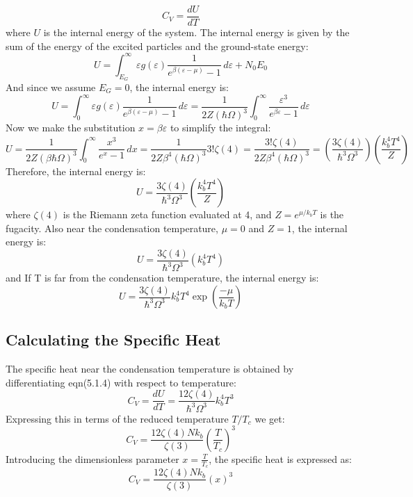 \documentclass{article}
\numberwithin{equation}{section}
\numberwithin{equation}{subsection}
\begin{document}
$$C_V = \frac{dU}{dT}$$
where \( U \) is the internal energy of the system. The internal energy is given by the sum of the energy of the excited particles and the ground-state energy:
\begin{equation}
    U = \int_{E_G}^{\infty} \varepsilon g(\varepsilon) \frac{1}{e^{\beta(\varepsilon - \mu)} - 1} \,d\varepsilon + N_0 E_0
\end{equation}
And since we assume $E_G = 0$, the internal energy is:
\begin{equation}
    U = \int_{0}^{\infty} \varepsilon g(\varepsilon) \frac{1}{e^{\beta(\varepsilon - \mu)} - 1} \,d\varepsilon = \frac{1}{2Z(\hbar\Omega)^3} \int_{0}^{\infty} \frac{\varepsilon^3}{e^{\beta\varepsilon} - 1} \,d\varepsilon
\end{equation}
Now we make the substitution \( x = \beta\varepsilon\) to simplify the integral:
$$U = \frac{1}{2Z(\beta\hbar\Omega)^3} \int_{0}^{\infty} \frac{x^3}{e^x - 1} \,dx = \frac{1}{2Z\beta^4(\hbar\Omega)^3} 3!\zeta(4) = \frac{3!\zeta(4)}{2Z\beta^4(\hbar\Omega)^3} =   \left(\frac{3\zeta(4)}{\hbar^3\Omega^3}\right) \left(\frac{k_b^4T^4}{Z}\right) 
$$
Therefore, the internal energy is:
\begin{equation}
    U = \frac{3\zeta(4)}{\hbar^3\Omega^3} \left(\frac{k_b^4T^4}{Z}\right)
\end{equation}
where \( \zeta(4) \) is the Riemann zeta function evaluated at 4, and $Z = e^{\mu/k_bT}$ is the fugacity. Also near the condensation temperature, $\mu = 0$ and $Z = 1$, the internal energy is:   
\begin{equation}
    U = \frac{3\zeta(4)}{\hbar^3\Omega^3} \left(k_b^4T^4\right) 
\end{equation}
and If T is far from the condensation temperature, the internal energy is:
\begin{equation}
    U = \frac{3\zeta(4)}{\hbar^3\Omega^3} k_b^4T^4\exp\left(\frac{-\mu}{k_bT}\right)
\end{equation}


\subsection{Calculating the Specific Heat}
The specific heat near the condensation temperature is obtained by differentiating eqn(5.1.4) with respect to temperature:
\begin{equation}
    C_V = \frac{dU}{dT} = \frac{12\zeta(4)}{\hbar^3\Omega^3}k_b^4T^3
\end{equation}
Expressing this in terms of the reduced temperature \( T/T_c \) we get:
\begin{equation}
    C_V = \frac{12\zeta(4) N k_b}{\zeta(3)} \left(\frac{T}{T_c}\right)^3
\end{equation}
Introducing the dimensionless parameter \( x = \frac{T}{T_c} \), the specific heat is expressed as:
\begin{equation}
    C_V = \frac{12\zeta(4) N k_b}{\zeta(3)} \left(x\right)^3
\end{equation}
\end{document}

